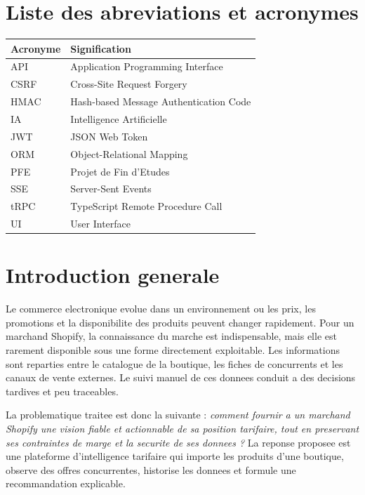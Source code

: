 \documentclass[12pt,a4paper,oneside]{report}
\begin{document}
\chapter*{Liste des abreviations et acronymes}
\begin{longtable}{p{}p{}}
\toprule
\textbf{Acronyme} & \textbf{Signification} \\
\midrule
\endhead
API & Application Programming Interface \\
CSRF & Cross-Site Request Forgery \\
HMAC & Hash-based Message Authentication Code \\
IA & Intelligence Artificielle \\
JWT & JSON Web Token \\
ORM & Object-Relational Mapping \\
PFE & Projet de Fin d'Etudes \\
SSE & Server-Sent Events \\
tRPC & TypeScript Remote Procedure Call \\
UI & User Interface \\
\bottomrule
\end{longtable}
\clearpage

\setcounter{page}{1}

\chapter*{Introduction generale}

Le commerce electronique evolue dans un environnement ou les prix, les promotions et la disponibilite des produits peuvent changer rapidement. Pour un marchand Shopify, la connaissance du marche est indispensable, mais elle est rarement disponible sous une forme directement exploitable. Les informations sont reparties entre le catalogue de la boutique, les fiches de concurrents et les canaux de vente externes. Le suivi manuel de ces donnees conduit a des decisions tardives et peu traceables.

La problematique traitee est donc la suivante : \textit{comment fournir a un marchand Shopify une vision fiable et actionnable de sa position tarifaire, tout en preservant ses contraintes de marge et la securite de ses donnees ?} La reponse proposee est une plateforme d'intelligence tarifaire qui importe les produits d'une boutique, observe des offres concurrentes, historise les donnees et formule une recommandation explicable.
\end{document}
